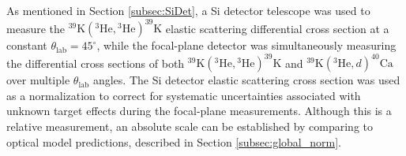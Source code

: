 As mentioned in Section \ref{subsec:SiDet}, a Si detector telescope was used to  measure the $^{39}\mathrm{K}(^{3}\mathrm{He}, {}^{3}\mathrm{He})^{39}\mathrm{K}$ elastic scattering differential cross section at a constant $\theta_{\mathrm{lab}} = 45^{\circ}$, while the focal-plane detector was simultaneously measuring the differential cross sections of both $^{39}\mathrm{K}(^{3}\mathrm{He}, {}^{3}\mathrm{He})^{39}\mathrm{K}$ and $^{39}\mathrm{K}(^{3}\mathrm{He}, d)^{40}\mathrm{Ca}$ over multiple $\theta_{\mathrm{lab}}$ angles. The Si detector elastic scattering cross section was used as a normalization to correct for systematic uncertainties associated with unknown target effects during the focal-plane measurements. Although this is a relative measurement, an absolute scale can be established by comparing to optical model predictions, described in Section \ref{subsec:global_norm}.

